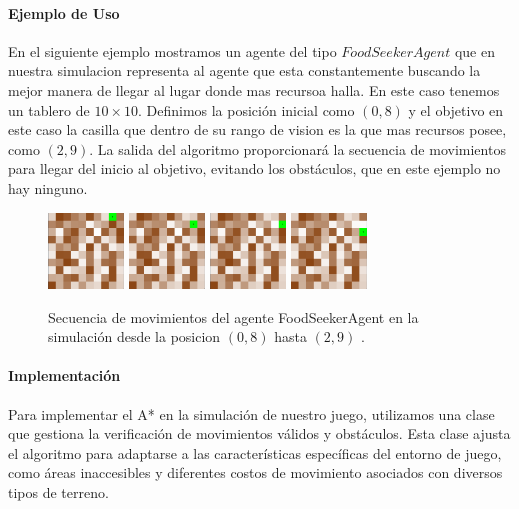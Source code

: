 \documentclass[11pt]{article}
\begin{document}
\paragraph{Ejemplo de Uso}
En el siguiente ejemplo mostramos un agente del tipo $FoodSeekerAgent$ que en nuestra simulacion representa al agente que esta constantemente buscando la mejor manera de llegar al lugar donde mas recursoa halla. En este caso tenemos un tablero de \(10 \times 10\). Definimos la posición inicial como \( (0, 8) \) y el objetivo en este caso la casilla que dentro de su rango de vision
es la que mas recursos posee, como \( (2, 9) \). La salida del algoritmo proporcionará la secuencia de movimientos para llegar del inicio al objetivo, evitando los obstáculos, que en este ejemplo no hay ninguno.

\begin{figure}[H]
    \centering
    \includegraphics[width=0.18\textwidth]{images/image1.png}\hfill
    \includegraphics[width=0.18\textwidth]{images/image2.png}\hfill
    \includegraphics[width=0.18\textwidth]{images/image3.png}\hfill
    \includegraphics[width=0.18\textwidth]{images/image4.png}
    \caption{Secuencia de movimientos del agente FoodSeekerAgent en la simulación desde la posicion \( (0, 8) \) hasta \( (2, 9) \) .}
\end{figure}

\paragraph{Implementación}
Para implementar el A* en la simulación de nuestro juego, utilizamos una clase que gestiona la verificación de movimientos válidos y obstáculos. Esta clase ajusta el algoritmo para adaptarse a las características específicas del entorno de juego, como áreas inaccesibles y diferentes costos de movimiento asociados con diversos tipos de terreno.
\end{document}

